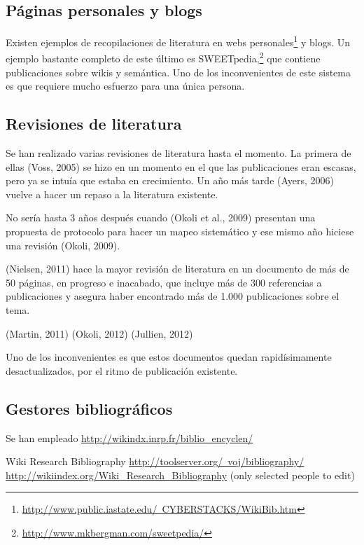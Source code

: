 \documentclass[11pt,twocolumn]{article}
\begin{document}
\subsection{Páginas personales y blogs}
Existen ejemplos de recopilaciones de literatura en webs personales\footnote{\href{http://www.public.iastate.edu/~CYBERSTACKS/WikiBib.htm}{http://www.public.iastate.edu/~CYBERSTACKS/WikiBib.htm}} y blogs. Un ejemplo bastante completo de este último es SWEETpedia,\footnote{\href{http://www.mkbergman.com/sweetpedia/}{http://www.mkbergman.com/sweetpedia/}} que contiene publicaciones sobre wikis y semántica. Uno de los inconvenientes de este sistema es que requiere mucho esfuerzo para una única persona.

\subsection{Revisiones de literatura}
Se han realizado varias revisiones de literatura hasta el momento. La primera de ellas (Voss, 2005) se hizo en un momento en el que las publicaciones eran escasas, pero ya se intuía que estaba en crecimiento. Un año más tarde (Ayers, 2006) vuelve a hacer un repaso a la literatura existente.

No sería hasta 3 años después cuando (Okoli et al., 2009) presentan una propuesta de protocolo para hacer un mapeo sistemático y ese mismo año hiciese una revisión (Okoli, 2009).

(Nielsen, 2011) hace la mayor revisión de literatura en un documento de más de 50 páginas, en progreso e inacabado, que incluye más de 300 referencias a publicaciones y asegura haber encontrado más de 1.000 publicaciones sobre el tema.

(Martin, 2011)
(Okoli, 2012)
(Jullien, 2012)

Uno de los inconvenientes es que estos documentos quedan rapidísimamente desactualizados, por el ritmo de publicación existente.

\subsection{Gestores bibliográficos}
Se han empleado \href{http://wikindx.inrp.fr/biblio_encyclen/}{http://wikindx.inrp.fr/biblio\_encyclen/}

Wiki Research Bibliography
\href{http://toolserver.org/~voj/bibliography/}{http://toolserver.org/~voj/bibliography/}
\href{http://wikiindex.org/Wiki_Research_Bibliography}{http://wikiindex.org/Wiki\_Research\_Bibliography}
(only selected people to edit)
\end{document}

